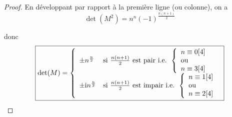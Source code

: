 \begin{proof}
    En développant par rapport à la première ligne (ou colonne), on a 
    \begin{equation}
        \det(M^{2})=n^{n}(-1)^{\frac{n(n+1)}{2}}
    \end{equation}

    donc 
    \begin{equation}
        \boxed{\det(M)=
        \left\lbrace
            \begin{array}[]{ll}
                \pm n^{\frac{n}{2}} &\text{si }\frac{n(n+1)}{2}\text{ est pair i.e. }
                \left\lbrace
                \begin{array}[]{l}
                    n\equiv 0[4]\\
                    \text{ou}\\
                    n\equiv 3[4]
                \end{array}
                \right.\\
                \pm \i n^{\frac{n}{2}} &\text{si }\frac{n(n+1)}{2}\text{ est impair i.e. }
                \left\lbrace
                \begin{array}[]{l}
                    n\equiv 1[4]\\
                    \text{ou}\\
                    n\equiv 2[4]
                \end{array}
                \right.\\
            \end{array}
        \right.
        }
    \end{equation}
\end{proof}

